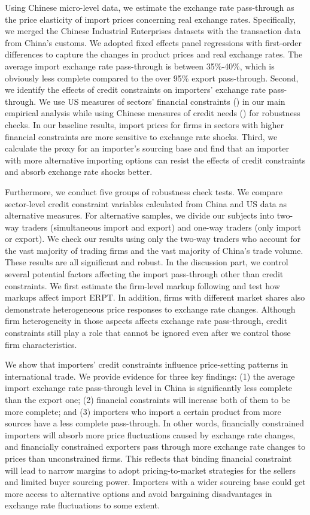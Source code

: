 \documentclass[12pt]{article}
\begin{document}
Using Chinese micro-level data, we estimate the exchange rate pass-through as the price elasticity of import prices concerning real exchange rates. Specifically, we merged the Chinese Industrial Enterprises datasets with the transaction data from China’s customs. We adopted fixed effects panel regressions with first-order differences to capture the changes in product prices and real exchange rates. The average import exchange rate pass-through is between 35\%-40\%, which is obviously less complete compared to the over 95\% export pass-through. Second, we identify the effects of credit constraints on importers' exchange rate pass-through. We use US measures of sectors’ financial constraints (\cite{manova-wei-zhang2015}) in our main empirical analysis while using Chinese measures of credit needs (\cite{fan-li-yeaple2015}) for robustness checks. In our baseline results, import prices for firms in sectors with higher financial constraints are more sensitive to exchange rate shocks. Third, we calculate the proxy for an importer's sourcing base and find that an importer with more alternative importing options can resist the effects of credit constraints and absorb exchange rate shocks better.

Furthermore, we conduct five groups of robustness check tests. We compare sector-level credit constraint variables calculated from China and US data as alternative measures. For alternative samples, we divide our subjects into two-way traders (simultaneous import and export) and one-way traders (only import or export). We check our results using only the two-way traders who account for the vast majority of trading firms and the vast majority of China's trade volume. These results are all significant and robust. In the discussion part, we control several potential factors affecting the import pass-through other than credit constraints. We first estimate the firm-level markup following \cite{dlw2012} and test how markups affect import ERPT. In addition, firms with different market shares also demonstrate heterogeneous price responses to exchange rate changes. Although firm heterogeneity in those aspects affects exchange rate pass-through, credit constraints still play a role that cannot be ignored even after we control those firm characteristics. 

We show that importers' credit constraints influence price-setting patterns in international trade. We provide evidence for three key findings: (1) the average import exchange rate pass-through level in China is significantly less complete than the export one; (2) financial constraints will increase both of them to be more complete; and (3) importers who import a certain product from more sources have a less complete pass-through. In other words, financially constrained importers will absorb more price fluctuations caused by exchange rate changes, and financially constrained exporters pass through more exchange rate changes to prices than unconstrained firms. This reflects that binding financial constraint will lead to narrow margins to adopt pricing-to-market strategies for the sellers and limited buyer sourcing power. Importers with a wider sourcing base could get more access to alternative options and avoid bargaining disadvantages in exchange rate fluctuations to some extent.
\end{document}
